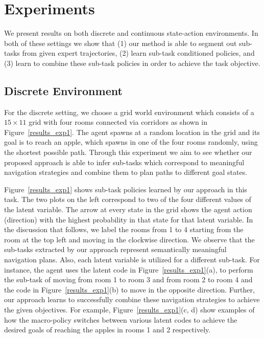 \documentclass{article} %
\begin{document}
\section{Experiments}

We present results on both discrete and continuous state-action environments. In both of these settings we show that (1) our method is able to segment out sub-tasks from given expert trajectories, (2) learn sub-task conditioned policies, and (3) learn to combine these sub-task policies in order to achieve the task objective. 

\subsection{Discrete Environment}

For the discrete setting, we choose a grid world environment which consists of a $15 \times 11 $ grid with four rooms connected via corridors as shown in Figure~\ref{results_exp1}. The agent spawns at a random location in the grid and its goal is to reach an apple, which spawns in one of the four rooms randomly, using the shortest possible path.
Through this experiment we aim to see whether our proposed approach is able to infer sub-tasks which correspond to meaningful navigation strategies and combine them to plan paths to different goal states.

Figure~\ref{results_exp1} shows sub-task policies learned by our approach in this task. The two plots on the left correspond to two of the four different values of the latent variable. The arrow at every state in the grid shows the agent action (direction) with the highest probability in that state for that latent variable. In the discussion that follows, we label the rooms from 1 to 4 starting from the room at the top left and moving in the clockwise direction. 
We observe that the sub-tasks extracted by our approach represent semantically meaningful navigation plans. Also, each latent variable is utilized for a different sub-task.
For instance, the agent uses the latent code in Figure~\ref{results_exp1}(a), to perform the sub-task of moving from room 1 to room 3 and from room 2 to room 4 and the code in Figure~\ref{results_exp1}(b) to move in the opposite direction.
Further, our approach learns to successfully combine these navigation strategies to achieve the given objectives. For example,  
Figure~\ref{results_exp1}(c, d) show examples of how the macro-policy switches between various latent codes to achieve the desired goals of reaching the apples in rooms 1 and 2 respectively. 
\end{document}
